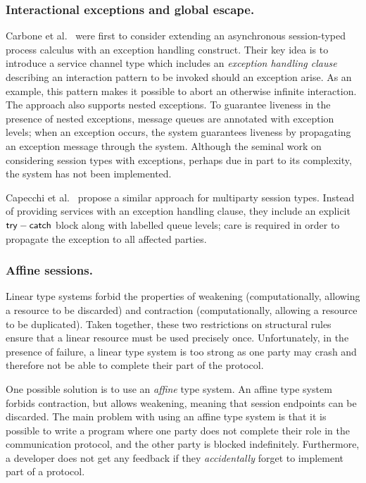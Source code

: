 \documentclass[
graybox,
envcountchap
]{svmult}
\begin{document}
\begin{bibunit}
  \subsubsection{Interactional exceptions and global escape.}
  Carbone et al.~\cite{CarboneHY08:exceptions} were first to consider extending
  an asynchronous session-typed process calculus with an exception handling
  construct. Their key idea is to introduce a service channel type which includes an
  \emph{exception handling clause} describing an interaction pattern to be
  invoked should an exception arise. As an example, this pattern makes it
  possible to abort an otherwise infinite interaction. The approach also
  supports nested exceptions. To guarantee liveness in the presence of nested
  exceptions, message queues are annotated with exception levels; when an
  exception occurs, the system guarantees liveness by propagating an exception
  message through the system. Although the seminal work on considering session
  types with exceptions, perhaps due in part to its complexity, the system has
  not been implemented.

  Capecchi et al.~\cite{CapecchiGY16:global-escape} propose a similar approach
  for multiparty session types. Instead of providing services with an exception
  handling clause, they include an explicit $\mathsf{try}-\mathsf{catch}$ block
  along with labelled queue levels; care is required in order to propagate the
  exception to all affected parties.

  \subsubsection{Affine sessions.}

  Linear type systems forbid the properties of weakening (computationally,
  allowing a resource to be discarded) and contraction (computationally,
  allowing a resource to be duplicated).  Taken together, these two restrictions
  on structural rules ensure that a linear resource must be used precisely once.
  Unfortunately, in the presence of failure, a linear type system is too strong
  as one party may crash and therefore not be able to complete their part of the
  protocol.

  One possible solution is to use an \emph{affine} type system. An affine type
  system forbids contraction, but allows weakening,
  meaning that session endpoints can be discarded.
%
  The main problem with using an affine type system is that it is possible to
  write a program where one party does not complete their role in the
  communication protocol, and the other party is blocked indefinitely.
  Furthermore, a developer does not get any feedback if they \emph{accidentally}
  forget to implement part of a protocol.


\end{bibunit}
\end{document}

